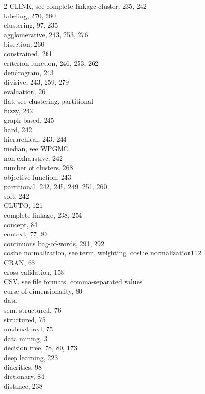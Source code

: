 \documentclass[11pt,openany,executivepaper]{book}
\begin{document}
\begin{multicols}{2}
CLINK, see complete linkage cluster, 235, 242\\
labeling, 270, 280\\
clustering, 97, 235\\
agglomerative, 243, 253, 276\\
bisection, 260\\
constrained, 261\\
criterion function, 246, 253, 262\\
dendrogram, 243\\
divisive, 243, 259, 279\\
evaluation, 261\\
flat, see clustering, partitional\\
fuzzy, 242\\
graph based, 245\\
hard, 242\\
hierarchical, 243, 244\\
median, see WPGMC\\
non-exhaustive, 242\\
number of clusters, 268\\
objective function, 243\\
partitional, 242, 245, 249, 251, 260\\
soft, 242\\
CLUTO, 121\\
complete linkage, 238, 254\\
concept, 84\\
context, 77, 83\\
continuous bag-of-words, 291, 292\\
cosine normalization, see term, weighting, cosine normalization112\\
CRAN, 66\\
cross-validation, 158\\
CSV, see file formats, comma-separated values\\
curse of dimensionality, 80\\
data\\
semi-structured, 76\\
structured, 75\\
unstructured, 75\\
data mining, 3\\
decision tree, 78, 80, 173\\
deep learning, 223\\
diacritics, 98\\
dictionary, 84\\
distance, 238\\

\end{multicols}
\end{document}
